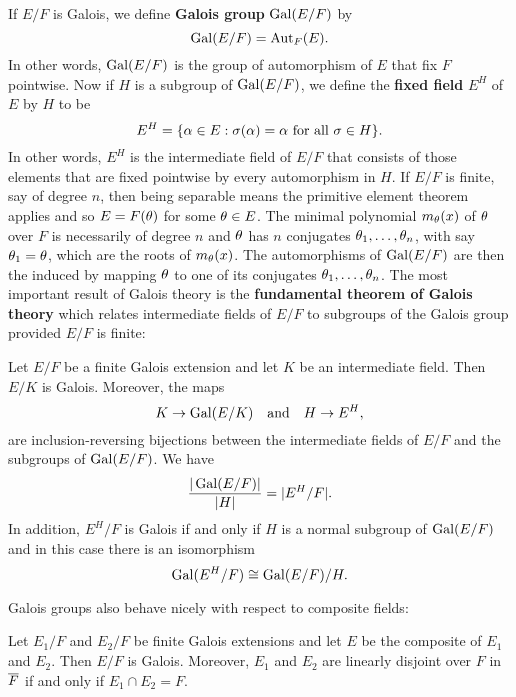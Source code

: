     If $E/F$ is Galois, we define \textbf{Galois group} $\operatorname{\mathrm{Gal}}(E/F)$ by
    \[
      \operatorname{\mathrm{Gal}}(E/F) = \operatorname{\mathrm{Aut}}_{F}(E).
    \]
    In other words, $\operatorname{\mathrm{Gal}}(E/F)$ is the group of automorphism of $E$ that fix $F$ pointwise. Now if $H$ is a subgroup of $\operatorname{\mathrm{Gal}}(E/F)$, we define the \textbf{fixed field} $E^{H}$ of $E$ by $H$ to be
    \[
      E^{H} = \{\alpha \in E:\text{$\sigma(\alpha) = \alpha$ for all $\sigma \in H$}\}.
    \] 
    In other words, $E^{H}$ is the intermediate field of $E/F$ that consists of those elements that are fixed pointwise by every automorphism in $H$. If $E/F$ is finite, say of degree $n$, then being separable means the primitive element theorem applies and so $E = F(\theta)$ for some $\theta \in E$. The minimal polynomial $m_{\theta}(x)$ of $\theta$ over $F$ is necessarily of degree $n$ and $\theta$ has $n$ conjugates $\theta_{1},\ldots,\theta_{n}$, with say $\theta_{1} = \theta$, which are the roots of $m_{\theta}(x)$. The automorphisms of $\operatorname{\mathrm{Gal}}(E/F)$ are then the induced by mapping $\theta$ to one of its conjugates $\theta_{1},\ldots,\theta_{n}$. The most important result of Galois theory is the \textbf{fundamental theorem of Galois theory} which relates intermediate fields of $E/F$ to subgroups of the Galois group provided $E/F$ is finite:

    \begin{theorem}
      Let $E/F$ be a finite Galois extension and let $K$ be an intermediate field. Then $E/K$ is Galois. Moreover, the maps
      \[
        K \to \operatorname{\mathrm{Gal}}(E/K) \quad \text{and} \quad H \to E^{H},
      \]
      are inclusion-reversing bijections between the intermediate fields of $E/F$ and the subgroups of $\operatorname{\mathrm{Gal}}(E/F)$. We have
      \[
        \frac{|\operatorname{\mathrm{Gal}}(E/F)|}{|H|} = |E^{H}/F|.
      \]
      In addition, $E^{H}/F$ is Galois if and only if $H$ is a normal subgroup of $\operatorname{\mathrm{Gal}}(E/F)$ and in this case there is an isomorphism
      \[
        \operatorname{\mathrm{Gal}}(E^{H}/F) \cong \operatorname{\mathrm{Gal}}(E/F)/H.
      \]
    \end{theorem}

    Galois groups also behave nicely with respect to composite fields:

    \begin{proposition}\label{prop:Galois_linearly_disjoint}
      Let $E_{1}/F$ and $E_{2}/F$ be finite Galois extensions and let $E$ be the composite of $E_{1}$ and $E_{2}$. Then $E/F$ is Galois. Moreover, $E_{1}$ and $E_{2}$ are linearly disjoint over $F$ in $\overline{F}$ if and only if $E_{1} \cap E_{2} = F$.
    \end{proposition}
